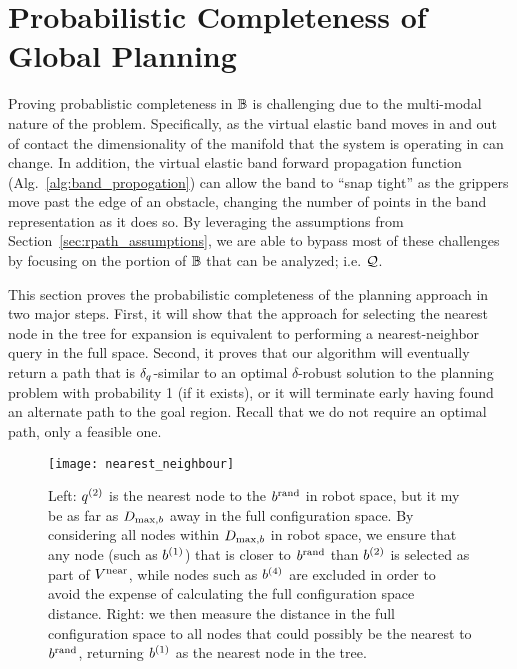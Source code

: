 \section{Probabilistic Completeness of Global Planning}
\label{sec:analysis}



Proving probablistic completeness in $\mathbb{B}$ is challenging due to the multi-modal nature of the problem. Specifically, as the virtual elastic band moves in and out of contact the dimensionality of the manifold that the system is operating in can change. In addition, the virtual elastic band forward propagation function (Alg.~\ref{alg:band_propogation}) can allow the band to ``snap tight'' as the grippers move past the edge of an obstacle, changing the number of points in the band representation as it does so. By leveraging the assumptions from Section~\ref{sec:rpath_assumptions}, we are able to bypass most of these challenges by focusing on the portion of $\mathbb{B}$ that can be analyzed; i.e. $\mathcal{Q}$.



This section proves the probabilistic completeness of the planning approach in two major steps.  First, it will show that the approach for selecting the nearest node in the tree for expansion is equivalent to performing a nearest-neighbor query in the full space.  Second, it proves that our algorithm will eventually return a path that is $\delta_q$-similar to an optimal $\delta$-robust solution to the planning problem with probability 1 (if it exists), or it will terminate early having found an alternate path to the goal region. Recall that we do not require an optimal path, only a feasible one.


\begin{figure}
    \centering
    \texttt{[image: nearest\_neighbour]}
    \caption{Left: $q^{(2)}$ is the nearest node to the $b^\textrm{rand}$ in robot space, but it my be as far as $D_{\textrm{max},b}$ away in the full configuration space. By considering all nodes within $D_{\textrm{max},b}$ in robot space, we ensure that any node (such as $b^{(1)}$) that is closer to $b^\textrm{rand}$ than $b^{(2)}$ is selected as part of $V^{\textrm{near}}$, while nodes such as $b^{(4)}$ are excluded in order to avoid the expense of calculating the full configuration space distance. Right: we then measure the distance in the full configuration space to all nodes that could possibly be the nearest to $b^\textrm{rand}$, returning $b^{(1)}$ as the nearest node in the tree.}
    \label{fig:nearest}
\end{figure}






